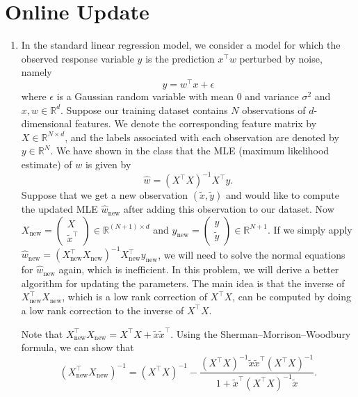 \documentclass[a3paper,12pt]{extarticle} %
\begin{document}
\section{Online Update}
    \begin{enumerate}
        \item In the standard linear regression model, we consider a model for which the observed response variable \( y \) is the prediction \( x^\top w \) perturbed by noise, namely
        \[ 
        y = w^\top x + \epsilon
        \]
        where \( \epsilon \) is a Gaussian random variable with mean 0 and variance \( \sigma^2 \) and \( x, w \in \mathbb{R}^d \). Suppose our training dataset contains \( N \) observations of \( d \)-dimensional features. We denote the corresponding feature matrix by \( X \in \mathbb{R}^{N \times d} \), and the labels associated with each observation are denoted by \( y \in \mathbb{R}^N \). We have shown in the class that the MLE (maximum likelihood estimate) of \( w \) is given by
        \[
        \hat{w} = (X^\top X)^{-1} X^\top y.
        \]
        Suppose that we get a new observation \( (\tilde{x}, \tilde{y}) \) and would like to compute the updated MLE \( \hat{w}_{\text{new}} \) after adding this observation to our dataset. Now \( X_{\text{new}} = \begin{pmatrix} X \\ \tilde{x}^\top \end{pmatrix} \in \mathbb{R}^{(N+1) \times d} \) and \( y_{\text{new}} = \begin{pmatrix} y \\ \tilde{y} \end{pmatrix} \in \mathbb{R}^{N+1} \). If we simply apply \( \hat{w}_{\text{new}} = (X_{\text{new}}^\top X_{\text{new}})^{-1} X_{\text{new}}^\top y_{\text{new}} \), we will need to solve the normal equations for \( \hat{w}_{\text{new}} \) again, which is inefficient. In this problem, we will derive a better algorithm for updating the parameters. The main idea is that the inverse of \( X_{\text{new}}^\top X_{\text{new}} \), which is a low rank correction of \( X^\top X \), can be computed by doing a low rank correction to the inverse of \( X^\top X \).

        Note that \( X_{\text{new}}^\top X_{\text{new}} = X^\top X + \tilde{x} \tilde{x}^\top \). Using the Sherman–Morrison–Woodbury formula, we can show that
        \[
        (X_{\text{new}}^\top X_{\text{new}})^{-1} = (X^\top X)^{-1} - \frac{(X^\top X)^{-1} \tilde{x} \tilde{x}^\top (X^\top X)^{-1}}{1 + \tilde{x}^\top (X^\top X)^{-1} \tilde{x}}.
        \]


\end{enumerate}
\end{document}
